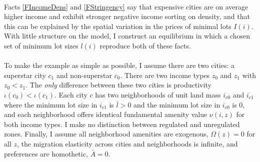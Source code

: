 \documentclass[11pt]{article}
\begin{document}
	\paragraph*{}
	Facts \ref{FIncomeDens} and \ref{FStringency} say that expensive cities are on average higher income and exhibit stronger negative income sorting on density, and that this can be explained by the spatial variation in the prices of minimal lots $I(i)$. With little structure on the model, I construct an equilibrium in which a chosen set of minimum lot sizes $l(i)$ reproduce both of these facts. 

	\paragraph*{}
	To make the example as simple as possible, I assume there are two cities: a superstar city $c_{1}$ and non-superstar $c_{0}$. There are two income types $z_{0}$ and $z_{1}$ with $z_{0} < z_{1}$. The \textit{only} difference between these two cities is productivity $\iota(c_{0}) < \iota(c_{1})$. Each city $c$ has two neighborhoods of unit land mass $i_{c0}$ and $i_{c1}$ where the minimum lot size in $i_{c1}$ is $\bar{l} > 0$ and the minimum lot size in $i_{c0}$ is 0, and each neighborhood offers identical fundamental amenity value $\nu(i, z)$ for both income types. I make no distinction between regulated and unregulated zones. Finally, I assume all neighborhood amenities are exogenous, $\Omega(z) = 0$ for all $z$, the migration elasticity across cities and neighborhoods is infinite, and preferences are homothetic, $\bar{A} = 0$.  
\end{document}
